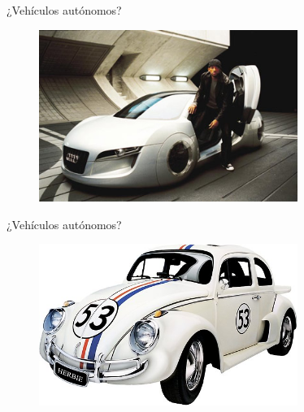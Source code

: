 \documentclass[10pt]{beamer}
\begin{document}
\begin{frame}[fragile]{¿Vehículos autónomos?}

    \begin{figure}[!h] 
        \centering
        \includegraphics[width=0.75\textwidth]{../img/irobot}
    \end{figure}
    
\end{frame}

\begin{frame}[fragile]{¿Vehículos autónomos?}

    \begin{figure}[!h] 
        \centering
        \includegraphics[width=0.75\textwidth]{../img/herbie}
    \end{figure}
        
\end{frame}
\end{document}
